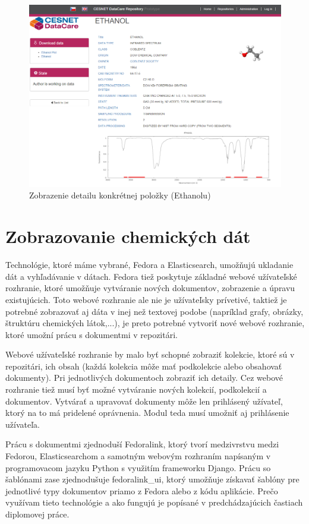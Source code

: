 \documentclass[thesis=M,slovak]{FITthesis}[2013/05/06]
\begin{document}
\begin{figure}\centering
	\includegraphics[width=1.0\textwidth]{grafika/detail_Ethanol.png}
 	\caption[Zobrazenie detailu konkrétnej položky (Ethanolu)]{Zobrazenie detailu konkrétnej položky (Ethanolu)}\label{graphics:Ethanol}
\end{figure}

\section{Zobrazovanie chemických dát}
Technológie, ktoré máme vybrané, Fedora a Elasticsearch, umožňujú ukladanie dát a vyhľadávanie v dátach. Fedora tiež poskytuje základné webové užívateľské rozhranie, ktoré umožňuje vytváranie nových dokumentov, zobrazenie a úpravu existujúcich. Toto webové rozhranie ale nie je užívateľsky prívetivé, taktiež je potrebné zobrazovať aj dáta v inej než textovej podobe (napríklad grafy, obrázky, štruktúru chemických látok,...), je preto potrebné vytvoriť nové webové rozhranie, ktoré umožní prácu s dokumentmi v repozitári.

Webové užívateľské rozhranie by malo byť schopné zobraziť kolekcie, ktoré sú v repozitári, ich obsah (každá kolekcia môže mať podkolekcie alebo obsahovať dokumenty). Pri jednotlivých dokumentoch zobraziť ich detaily. Cez webové rozhranie tiež musí byť možné vytváranie nových kolekcií, podkolekcií a dokumentov. Vytvárať a upravovať dokumenty môže len prihlásený užívateľ, ktorý na to má pridelené oprávnenia. Modul teda musí umožniť aj prihlásenie užívateľa.

Prácu s dokumentmi zjednoduší Fedoralink, ktorý tvorí medzivrstvu medzi Fedorou, Elasticsearchom a samotným webovým rozhraním napísaným v programovacom jazyku Python s využitím frameworku Django. Prácu so šablónami zase zjednodušuje fedoralink\_ui, ktorý umožňuje získavať šablóny pre jednotlivé typy dokumentov priamo z Fedora alebo z kódu aplikácie. Prečo využívam tieto technológie a ako fungujú je popísané v predchádzajúcich častiach diplomovej práce.
\end{document}

